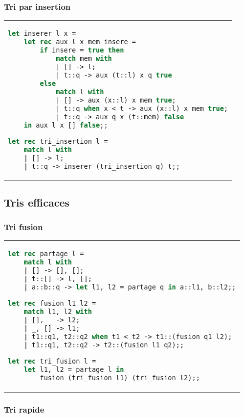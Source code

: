 \documentclass{hibiscus}
\begin{document}
\subsubsection{Tri par insertion}

\begin{tabular}{l}
\begin{lstlisting}[language=Caml]
let inserer l x =
    let rec aux l x mem insere =
        if insere = true then
            match mem with
            | [] -> l;
            | t::q -> aux (t::l) x q true
        else
            match l with
            | [] -> aux (x::l) x mem true;
            | t::q when x < t -> aux (x::l) x mem true;
            | t::q -> aux q x (t::mem) false
    in aux l x [] false;;

let rec tri_insertion l =
    match l with
    | [] -> l;
    | t::q -> inserer (tri_insertion q) t;; 
\end{lstlisting}
\end{tabular}

\subsection{Tris efficaces}

\subsubsection{Tri fusion}

\begin{tabular}{l}
\begin{lstlisting}[language=Caml]
let rec partage l =
    match l with
    | [] -> [], [];
    | t::[] -> l, [];
    | a::b::q -> let l1, l2 = partage q in a::l1, b::l2;;

let rec fusion l1 l2 =
    match l1, l2 with
    | [], _ -> l2;
    | _, [] -> l1;
    | t1::q1, t2::q2 when t1 < t2 -> t1::(fusion q1 l2);
    | t1::q1, t2::q2 -> t2::(fusion l1 q2);;

let rec tri_fusion l =
    let l1, l2 = partage l in
        fusion (tri_fusion l1) (tri_fusion l2);;
\end{lstlisting}
\end{tabular}

\subsubsection{Tri rapide}
\end{document}
